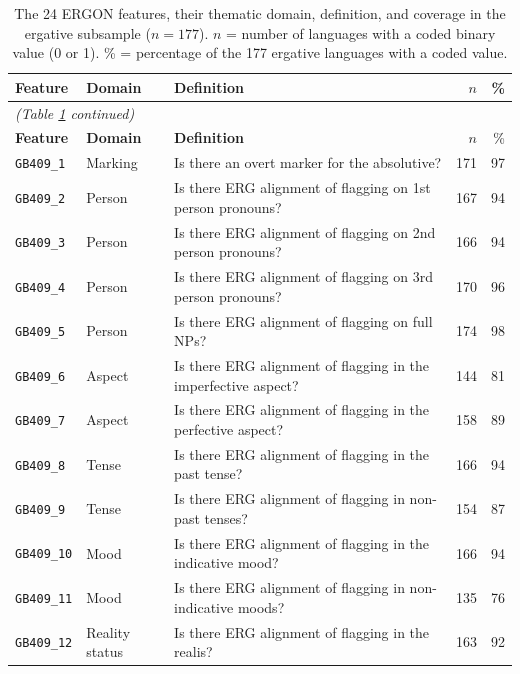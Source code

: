 \documentclass[12pt,a4paper]{article}
\newcommand{\feat}[1]{\texttt{#1}}
\begin{document}
\begin{longtable}{llp{6.5cm}rr}
\caption{The 24 ERGON features, their thematic domain, definition, and coverage in the ergative subsample ($n = 177$). $n$ = number of languages with a coded binary value (0 or 1). \% = percentage of the 177 ergative languages with a coded value.}
\label{tab:features}\\
\toprule
\textbf{Feature} & \textbf{Domain} & \textbf{Definition} & $n$ & \% \\
\midrule
\endfirsthead
\multicolumn{5}{l}{\small\textit{(Table \ref{tab:features} continued)}}\\[2pt]
\toprule
\textbf{Feature} & \textbf{Domain} & \textbf{Definition} & $n$ & \% \\
\midrule
\endhead
\bottomrule
\endfoot
\feat{GB409\_1}  & Marking     & Is there an overt marker for the absolutive?                               & 171 & 97 \\
\feat{GB409\_2}  & Person      & Is there ERG alignment of flagging on 1st person pronouns?                & 167 & 94 \\
\feat{GB409\_3}  & Person      & Is there ERG alignment of flagging on 2nd person pronouns?                & 166 & 94 \\
\feat{GB409\_4}  & Person      & Is there ERG alignment of flagging on 3rd person pronouns?                & 170 & 96 \\
\feat{GB409\_5}  & Person      & Is there ERG alignment of flagging on full NPs?                           & 174 & 98 \\
\feat{GB409\_6}  & Aspect      & Is there ERG alignment of flagging in the imperfective aspect?             & 144 & 81 \\
\feat{GB409\_7}  & Aspect      & Is there ERG alignment of flagging in the perfective aspect?              & 158 & 89 \\
\feat{GB409\_8}  & Tense       & Is there ERG alignment of flagging in the past tense?                     & 166 & 94 \\
\feat{GB409\_9}  & Tense       & Is there ERG alignment of flagging in non-past tenses?                    & 154 & 87 \\
\feat{GB409\_10} & Mood        & Is there ERG alignment of flagging in the indicative mood?                & 166 & 94 \\
\feat{GB409\_11} & Mood        & Is there ERG alignment of flagging in non-indicative moods?               & 135 & 76 \\
\feat{GB409\_12} & Reality status      & Is there ERG alignment of flagging in the realis?                         & 163 & 92 \\

\end{longtable}
\end{document}
